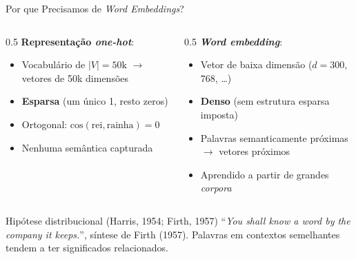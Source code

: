 \documentclass[aspectratio=169, xcolor=dvipsnames]{beamer}
\begin{document}
  \begin{frame}{Por que Precisamos de \textit{Word Embeddings}?}
    \begin{columns}
      \begin{column}{0.5\textwidth}
        \textbf{Representação \textit{one-hot}}:
        \begin{itemize}
          \item Vocabulário de $|V| = 50\text{k}$ $\to$ vetores de 50k dimensões
          \item \textbf{Esparsa} (um único 1, resto zeros)
          \item Ortogonal: $\text{cos}(\text{rei}, \text{rainha}) = 0$
          \item Nenhuma semântica capturada
        \end{itemize}
      \end{column}
      \begin{column}{0.5\textwidth}
        \textbf{\textit{Word embedding}}:
        \begin{itemize}
          \item Vetor de baixa dimensão ($d = 300$, $768$, \ldots)
          \item \textbf{Denso} (sem estrutura esparsa imposta)
          \item Palavras semanticamente próximas $\to$ vetores próximos
          \item Aprendido a partir de grandes \textit{corpora}
        \end{itemize}
      \end{column}
    \end{columns}
    \vspace{0.5em}
    \begin{block}{Hipótese distribucional (Harris, 1954; Firth, 1957)}
      ``\textit{You shall know a word by the company it keeps.}'', síntese de Firth (1957). Palavras em contextos semelhantes tendem a ter significados relacionados.
    \end{block}
  \end{frame}
\end{document}
